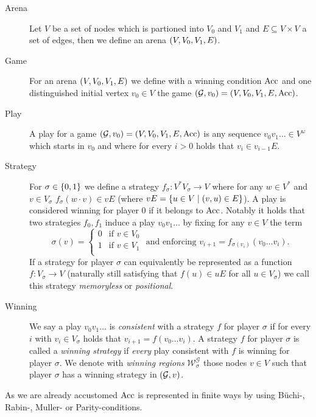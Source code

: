 \begin{definition}
  \begin{description}
    \item [Arena] Let $V$ be a set of nodes which is partioned into $V_{0}$ and
      $V_{1}$ and $E\subseteq V\times V$ a set of edges, then we define an
      arena $\left(V, V_{0}, V_{1}, E\right)$.
    \item [Game] For an arena $\left(V, V_{0}, V_{1}, E\right)$ we define with a
      winning condition $\operatorname{Acc}$ and one distinguished initial vertex
      $v_{0}\in V$ the game
      $\left(\mathcal{G}, v_{0}\right) = \left(V, V_{0}, V_{1}, E, \operatorname{Acc}\right)$.
    \item [Play] A play for a game $\left(\mathcal{G}, v_{0}\right) = \left(V,
      V_{0}, V_{1}, E, \operatorname{Acc}\right)$ is any sequence $v_{0}v_{1}\dots\in
      V^{\omega}$ which starts in $v_{0}$ and where for every $i > 0$ holds
      that $v_{i}\in v_{i-1}E$.
    \item [Strategy] For $\sigma\in\left\{0,1\right\}$ we define a strategy
      $f_{\sigma}: V^{*}V_{\sigma}\rightarrow V$ where for any $w\in V^{*}$ and
      $v\in V_{\sigma}$ $f_{\sigma}(w\cdot v)\in vE$ (where $vE =
      \left\{u\in V\mid\left(v,u\right)\in E\right\}$). A play is considered winning for
      player $0$ if it belongs to $\operatorname{Acc}$. Notably it holds that two strategies
      $f_{0}, f_{1}$ induce a play $v_{0}v_{1}\dots$ by fixing for any $v\in V$
      the term
      \begin{equation*}
        \sigma(v) = \begin{cases}
          0&\text{if }v\in V_{0}\\
          1&\text{if }v\in V_{1}\\
        \end{cases}\text{ and enforcing }
        v_{i+1} = f_{\sigma(v_{i})}(v_{0}\dots v_{i}).
      \end{equation*}
      If a strategy for player $\sigma$ can equivalently be represented as a
      function $f:V_{\sigma}\rightarrow V$ (naturally still satisfying that
      $f(u)\in uE$ for all $u\in V_{\sigma}$) we call this strategy
      \emph{memoryless} or \emph{positional}.
    \item [Winning] We say a play $v_{0}v_{1}\dots$ is \emph{consistent} with a
      strategy $f$ for player $\sigma$ if for every $i$ with
      $v_{i}\in V_{\sigma}$ holds that $v_{i+1} = f(v_{0}\dots v_{i})$. 
      A strategy $f$ for player $\sigma$ is called a \emph{winning strategy} if
      \emph{every} play consistent with $f$ is winning for player $\sigma$.
      We denote with \emph{winning regions}
      $\mathcal{W}^{\mathcal{G}}_{\sigma}$ those nodes $v\in V$ such that
      player $\sigma$ has a winning strategy in $\left(\mathcal{G}, v\right)$.
  \end{description}
  As we are already accustomed $\operatorname{Acc}$ is represented in finite ways by using
  Büchi-, Rabin-, Muller- or Parity-conditions.
\end{definition}
